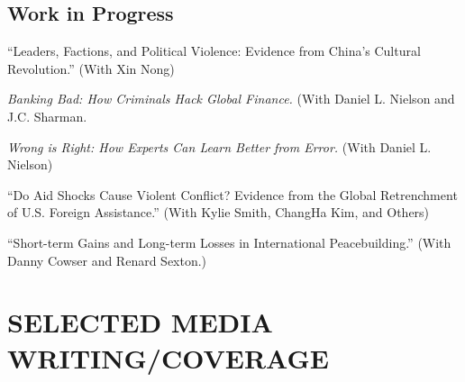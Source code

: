 \documentclass[10pt]{article}
\begin{document}
\noindent \subsection*{Work in Progress}

\begin{etaremune}\setlength{\itemsep}{3pt}

\item ``Leaders, Factions, and Political Violence: Evidence from China's Cultural Revolution.'' (With Xin Nong)

\item \textit{Banking Bad: How Criminals Hack Global Finance.} (With Daniel L. Nielson and J.C. Sharman.

\item \textit{Wrong is Right: How Experts Can Learn Better from Error.} (With Daniel L. Nielson)

\item ``Do Aid Shocks Cause Violent Conflict? Evidence from the Global Retrenchment of U.S. Foreign Assistance.'' (With Kylie Smith, ChangHa Kim, and Others)

\item ``Short-term Gains and Long-term Losses in International Peacebuilding.'' (With Danny Cowser and Renard Sexton.)







\end{etaremune}



\section*{SELECTED MEDIA WRITING/COVERAGE}
\end{document}

